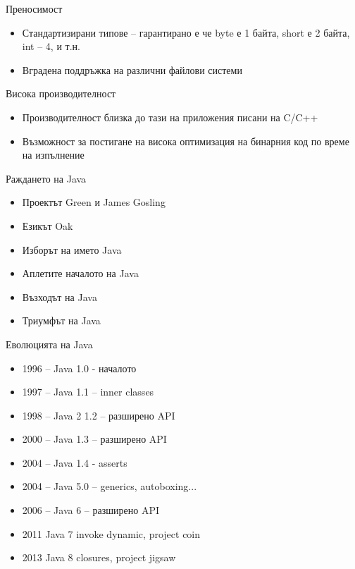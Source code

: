 \documentclass{beamer}
\begin{document}
\begin{frame}{Преносимост}
  \transdissolve
  \begin{itemize}
  \item Стандартизирани типове – гарантирано
  е че byte е 1 байта, short е 2 байта, int –
  4, и т.н.
  \item Вградена поддръжка на различни
  файлови системи
  \end{itemize}

\end{frame}


\begin{frame}{Висока производителност}
  \transdissolve
  \begin{itemize}
  \item Производителност близка до тази на
  приложения писани на C/C++
  \item Възможност за постигане на висока
  оптимизация на бинарния код по време
  на изпълнение
\end{itemize}

\end{frame}

\begin{frame}{Раждането на Java}
  \transdissolve
  \begin{itemize}
    \item Проектът Green и James Gosling
    \item Езикът Oak
    \item Изборът на името Java
    \item Аплетите началото на Java
    \item Възходът на Java
    \item Триумфът на Java
  \end{itemize}
\end{frame}

\begin{frame}{Еволюцията на Java}
  \transdissolve
  \begin{itemize}
  \item 1996 – Java 1.0 - началото
  \item 1997 – Java 1.1 – inner classes
  \item 1998 – Java 2 1.2 – разширено API
  \item 2000 – Java 1.3 – разширено API
  \item 2004 – Java 1.4 - asserts
  \item 2004 – Java 5.0 – generics, autoboxing...
  \item 2006 – Java 6 – разширено API
  \item 2011   Java 7 invoke dynamic, project coin
  \item 2013   Java 8 closures, project jigsaw
  \end{itemize}
\end{frame}
\end{document}
